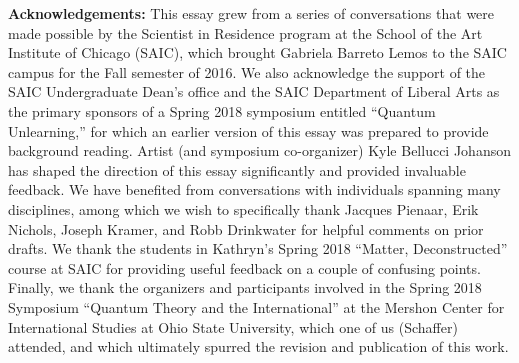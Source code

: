 \documentclass[onecolumn,preprintnumbers,amsmath,amssymbn,reprint,nofootinbib,superscriptaddress]{revtex4}    %
\begin{document}
\textbf{Acknowledgements:} This essay grew from a series of conversations that were made possible by the Scientist in Residence program at the School of the Art Institute of Chicago (SAIC), which brought Gabriela Barreto Lemos to the SAIC campus for the Fall semester of 2016.  We also acknowledge the support of the SAIC Undergraduate Dean's office and the SAIC Department of Liberal Arts as the primary sponsors of a Spring 2018 symposium entitled ``Quantum Unlearning,'' for which an earlier version of this essay was prepared to provide background reading.  Artist (and symposium co-organizer) Kyle Bellucci Johanson has shaped the direction of this essay significantly and provided invaluable feedback.  We have benefited from conversations with individuals spanning many disciplines, among which we wish to specifically thank Jacques Pienaar, Erik Nichols, Joseph Kramer, and Robb Drinkwater for helpful comments on prior drafts.  We thank the students in Kathryn's Spring 2018 ``Matter, Deconstructed'' course at SAIC for providing useful feedback on a couple of confusing points.  Finally, we thank the organizers and participants involved in the Spring 2018 Symposium ``Quantum Theory and the International'' at the Mershon Center for International Studies at Ohio State University, which one of us (Schaffer) attended, and which ultimately spurred the revision and publication of this work. 

\end{document}
